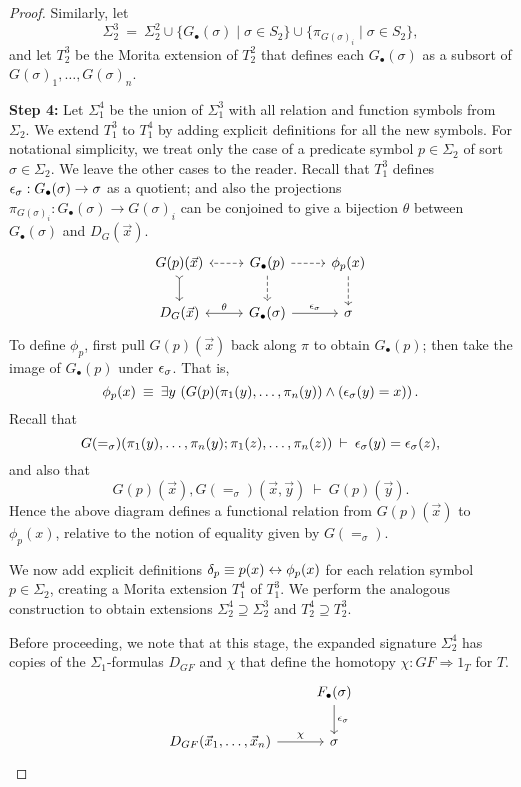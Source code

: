 \begin{proof}
Similarly, let
\[ \Sigma ^3_2 \:=\: \Sigma ^2_2\cup \{ G_\bullet (\sigma )\mid \sigma
  \in S_2\}\cup \{ \pi _{G(\sigma )_i} \mid \sigma \in S_2 \} , \] and
let $T^3_2$ be the Morita extension of $T^2_2$ that defines each
$G _\bullet (\sigma )$ as a subsort of
$G(\sigma )_1,\dots ,G(\sigma )_n$.



\bigskip \textbf{Step 4:} Let $\Sigma _1^4$ be the union of
$\Sigma _1^3$ with all relation and function symbols from $\Sigma _2$.
We extend $T_1^3$ to $T_1^4$ by adding explicit definitions for all
the new symbols.  For notational simplicity, we treat only the case of
a predicate symbol $p\in\Sigma _2$ of sort $\sigma\in\Sigma _2$.  We
leave the other cases to the reader.  Recall that $T_1^3$ defines
$\epsilon _\sigma :G_\bullet (\sigma )\to \sigma$ as a quotient; and also
the projections
$\pi _{G(\sigma )_i}:G_\bullet (\sigma )\to G(\sigma )_i$ can be
conjoined to give a bijection $\theta$ between $G_\bullet (\sigma )$
and $D_G(\vec{x})$.
\[ \begin{tikzcd}
    G(p)(\vec{x}) \arrow[>->]{d}  & G_\bullet (p) \arrow[dashed]{d} \arrow[dashed]{r}
    \arrow[<->,dashed]{l} & \phi _p(x) \arrow[dashed]{d} \\
    D_G(\vec{x}) & G_\bullet (\sigma ) \arrow[<->]{l}[above]{\theta}
    \arrow{r}{\ve _\sigma} & \sigma 
  \end{tikzcd} \] To define $\phi _p$, first pull $G(p)(\vec{x})$ back
along $\pi$ to obtain $G_\bullet (p)$; then take the image of
$G_\bullet (p)$ under $\epsilon _\sigma$.  That is,
\[ \phi _p(x)\: \equiv \: \exists y \, \left( G(p)(\pi _1(y),\dots
    ,\pi _n(y))\wedge (\epsilon _\sigma (y)=x ) \right) .\]  Recall that
\[ G(=_\sigma )(\pi _1(y),\dots ,\pi _n(y);\pi _1(z),\dots ,\pi _n(z))
  \: \vdash \: \epsilon _\sigma (y)=\epsilon _\sigma (z) ,\] and also that
\[ G(p)(\vec{x}),G(=_\sigma )(\vec{x},\vec{y}) \: \vdash \:
  G(p)(\vec{y}) .\] Hence the above diagram defines a functional
relation from $G(p)(\vec{x})$ to $\phi _p(x)$, relative to the notion
of equality given by $G(=_\sigma )$.

We now add explicit definitions $\delta _p\equiv p(x)\leftrightarrow \phi _p(x)$
for each relation symbol $p\in \Sigma _2$, creating a Morita extension
$T_1^4$ of $T_1^3$.  We perform the analogous construction to obtain
extensions $\Sigma _2^4\supseteq \Sigma _2^3$ and
$T_2^4\supseteq T_2^3$.


Before proceeding, we note that at this stage, the expanded signature
$\Sigma _2^4$ has copies of the $\Sigma _1$-formulas $D_{GF}$ and
$\chi$ that define the homotopy $\chi :GF\Rightarrow 1_T$ for $T$.
\[ \begin{tikzcd}
     & F_\bullet (\sigma ) \arrow{d}{\ve _\sigma } \\ 
    D_{GF}(\vec{x}_1,\dots ,\vec{x}_n) \arrow{r}{\chi} & \sigma     
  \end{tikzcd} \]



\end{proof}
